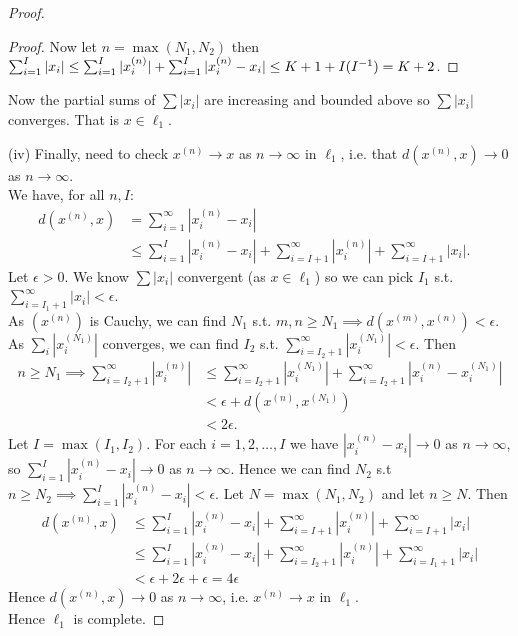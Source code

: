 \begin{proof}
\begin{proof}
        Now let $n = \max (N_1, N_2)$ then $\sum_{i=1}^{I} |x_i| \leq \sum_{i=1}^{I} |x_i^{(n)}| + \sum_{i=1}^{I} |x_i^{(n)} - x_i| \leq K + 1 + I (I^{-1}) = K + 2$.
    \end{proof} 

    Now the partial sums of $\sum |x_i|$ are increasing and bounded above so $\sum |x_i|$ converges.
    That is $x \in \ell_1$. 

    (iv) Finally, need to check $x^{(n)} \to x$ as $n \to \infty$ in $\ell_1$, i.e. that $d(x^{(n)}, x) \to 0$ as $n \to \infty$. \\
    We have, for all $n, I$:
    \begin{align*}
        d(x^{(n)}, x) &= \sum_{i=1}^{\infty} |x_i^{(n)} - x_i| &\\
        &\leq \sum_{i=1}^{I} |x_i^{(n)} - x_i| + \sum_{i=I+1}^{\infty} |x_i^{(n)}| + \sum_{i=I + 1}^{\infty} |x_i|.
    \end{align*}
    Let $\epsilon>0$.
    We know $\sum |x_i|$ convergent (as $x \in \ell_1$) so we can pick $I_1$ s.t. $\sum_{i=I_1+1}^{\infty} |x_i| < \epsilon$. \\
    As $(x^{(n)})$ is Cauchy, we can find $N_1$ s.t. $m, n \geq N_1 \implies d(x^{(m)}, x^{(n)}) < \epsilon$.
    As $\sum_i |x_i^{(N_1)}|$ converges, we can find $I_2$ s.t. $\sum_{i=I_2+1}^{\infty} |x_i^{(N_1)}| < \epsilon$.
    Then
    \begin{align*}
        n \geq N_1 \implies \sum_{i=I_2 + 1}^{\infty} |x_i^{(n)}| &\leq \sum_{i=I_2 + 1}^{\infty} |x_i^{(N_1)}| + \sum_{i=I_2 + 1}^{\infty} |x_i^{(n)} - x_i^{(N_1)}| \\
        &< \epsilon + d(x^{(n)}, x^{(N_1)}) \\
        &< 2\epsilon.
    \end{align*} 
    Let $I = \max(I_1, I_2)$.
    For each $i = 1, 2, \dots, I$ we have $|x_i^{(n)} - x_i| \to 0$ as $n \to \infty$, so $\sum_{i=1}^{I} |x_i^{(n)} - x_i| \to 0$ as $n \to \infty$.
    Hence we can find $N_2$ s.t $n \geq N_2 \implies \sum_{i=1}^{I} |x_i^{(n)} - x_i| < \epsilon$.
    Let $N = \max(N_1, N_2)$ and let $n \geq N$.
    Then \begin{align*}
        d(x^{(n)}, x) &\leq \sum_{i=1}^{I} |x_i^{(n)} - x_i| + \sum_{i=I+1}^{\infty} |x_i^{(n)}| + \sum_{i=I+1}^{\infty} |x_i| \\
        &\leq \sum_{i=1}^{I} |x_i^{(n)} - x_i| + \sum_{i=I_2 + 1}^\infty |x_i^{(n)}| + \sum_{i=I_1 + 1}^{\infty} |x_i| \\
        &< \epsilon + 2\epsilon + \epsilon = 4\epsilon  
    \end{align*} 
    Hence $d(x^{(n)}, x) \to 0$ as $n \to \infty$, i.e. $x^{(n)} \to x$ in $\ell_1$. \\
    Hence $\ell_1$ is complete.
\end{proof} 

